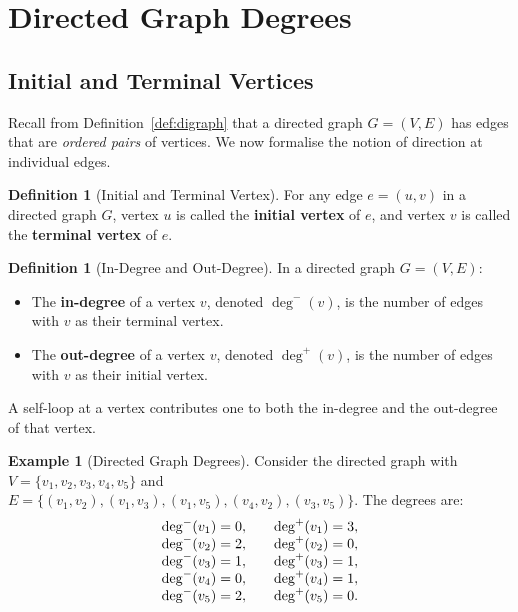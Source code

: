 \documentclass[11pt, a4paper, notitlepage]{report}
\theoremstyle{definition}
\newtheorem{definition}[theorem]{Definition}
\newtheorem{example}[theorem]{Example}
\theoremstyle{remark}
\begin{document}
\section{Directed Graph Degrees}
\label{sec:digraph-degrees}

\subsection{Initial and Terminal Vertices}
\label{subsec:initial-terminal}

Recall from Definition~\ref{def:digraph} that a directed graph $G = (V,E)$ has edges that are
\emph{ordered pairs} of vertices. We now formalise the notion of direction at individual edges.

\begin{definition}[Initial and Terminal Vertex]
\label{def:initial-terminal}
For any edge $e = (u,v)$ in a directed graph $G$, vertex $u$ is called the
\textbf{initial vertex} of $e$, and vertex $v$ is called the \textbf{terminal vertex} of $e$.
\end{definition}

\begin{definition}[In-Degree and Out-Degree]
\label{def:in-out-degree}
In a directed graph $G = (V,E)$:
\begin{itemize}
  \item The \textbf{in-degree} of a vertex $v$, denoted $\deg^{-}(v)$, is the number of edges
    with $v$ as their terminal vertex.
  \item The \textbf{out-degree} of a vertex $v$, denoted $\deg^{+}(v)$, is the number of edges
    with $v$ as their initial vertex.
\end{itemize}
A self-loop at a vertex contributes one to both the in-degree and the out-degree of that vertex.
\end{definition}

\begin{example}[Directed Graph Degrees]
\label{ex:digraph-degrees}
Consider the directed graph with $V = \{v_1, v_2, v_3, v_4, v_5\}$ and
$E = \{(v_1,v_2),(v_1,v_3),(v_1,v_5),(v_4,v_2),(v_3,v_5)\}$.
The degrees are:
\[
\begin{array}{l@{\qquad}l}
  \deg^{-}(v_1) = 0, & \deg^{+}(v_1) = 3, \\
  \deg^{-}(v_2) = 2, & \deg^{+}(v_2) = 0, \\
  \deg^{-}(v_3) = 1, & \deg^{+}(v_3) = 1, \\
  \deg^{-}(v_4) = 0, & \deg^{+}(v_4) = 1, \\
  \deg^{-}(v_5) = 2, & \deg^{+}(v_5) = 0.
\end{array}
\]
\end{example}
\end{document}

